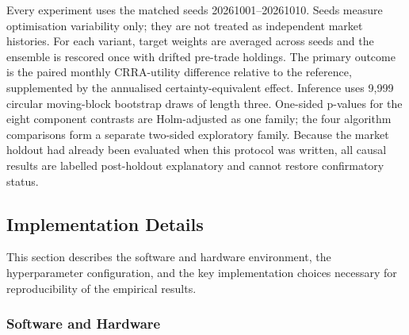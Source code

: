 Every experiment uses the matched seeds 20261001--20261010. Seeds measure optimisation variability only; they are not treated as independent market histories. For each variant, target weights are averaged across seeds and the ensemble is rescored once with drifted pre-trade holdings. The primary outcome is the paired monthly CRRA-utility difference relative to the reference, supplemented by the annualised certainty-equivalent effect. Inference uses 9,999 circular moving-block bootstrap draws of length three. One-sided p-values for the eight component contrasts are Holm-adjusted as one family; the four algorithm comparisons form a separate two-sided exploratory family. Because the market holdout had already been evaluated when this protocol was written, all causal results are labelled post-holdout explanatory and cannot restore confirmatory status.




\subsection{Implementation Details}
\label{subsec:3_implementation}

This section describes the software and hardware environment, the hyperparameter configuration, and the key implementation choices necessary for reproducibility of the empirical results.

\subsubsection{Software and Hardware}
\label{subsubsec:3_software_hardware}

